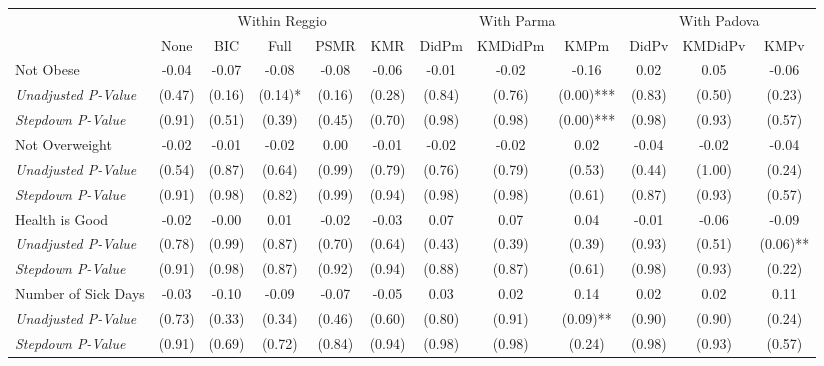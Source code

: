 \begin{tabular}{l c c c c c c c c c c c}
\toprule
& \multicolumn{5}{c}{Within Reggio} & \multicolumn{3}{c}{With Parma} & \multicolumn{3}{c}{With Padova} \\\cmidrule(lr){2-6} \cmidrule(lr){7-9} \cmidrule(lr){10-12}
 & None & BIC & Full & PSMR & KMR & DidPm & KMDidPm & KMPm & DidPv & KMDidPv & KMPv \\
\midrule
Not Obese & -0.04 & -0.07 & -0.08 & -0.08 & -0.06 & -0.01 & -0.02 & -0.16 & 0.02 & 0.05 & -0.06 \\
\quad \textit{Unadjusted P-Value} & (0.47) & (0.16) & (0.14)* & (0.16) & (0.28) & (0.84) & (0.76) & (0.00)*** & (0.83) & (0.50) & (0.23) \\
\quad \textit{Stepdown P-Value} & (0.91) & (0.51) & (0.39) & (0.45) & (0.70) & (0.98) & (0.98) & (0.00)*** & (0.98) & (0.93) & (0.57) \\
Not Overweight & -0.02 & -0.01 & -0.02 & 0.00 & -0.01 & -0.02 & -0.02 & 0.02 & -0.04 & -0.02 & -0.04 \\
\quad \textit{Unadjusted P-Value} & (0.54) & (0.87) & (0.64) & (0.99) & (0.79) & (0.76) & (0.79) & (0.53) & (0.44) & (1.00) & (0.24) \\
\quad \textit{Stepdown P-Value} & (0.91) & (0.98) & (0.82) & (0.99) & (0.94) & (0.98) & (0.98) & (0.61) & (0.87) & (0.93) & (0.57) \\
Health is Good & -0.02 & -0.00 & 0.01 & -0.02 & -0.03 & 0.07 & 0.07 & 0.04 & -0.01 & -0.06 & -0.09 \\
\quad \textit{Unadjusted P-Value} & (0.78) & (0.99) & (0.87) & (0.70) & (0.64) & (0.43) & (0.39) & (0.39) & (0.93) & (0.51) & (0.06)** \\
\quad \textit{Stepdown P-Value} & (0.91) & (0.98) & (0.87) & (0.92) & (0.94) & (0.88) & (0.87) & (0.61) & (0.98) & (0.93) & (0.22) \\
Number of Sick Days & -0.03 & -0.10 & -0.09 & -0.07 & -0.05 & 0.03 & 0.02 & 0.14 & 0.02 & 0.02 & 0.11 \\
\quad \textit{Unadjusted P-Value} & (0.73) & (0.33) & (0.34) & (0.46) & (0.60) & (0.80) & (0.91) & (0.09)** & (0.90) & (0.90) & (0.24) \\
\quad \textit{Stepdown P-Value} & (0.91) & (0.69) & (0.72) & (0.84) & (0.94) & (0.98) & (0.98) & (0.24) & (0.98) & (0.93) & (0.57) \\
\bottomrule
\end{tabular}
